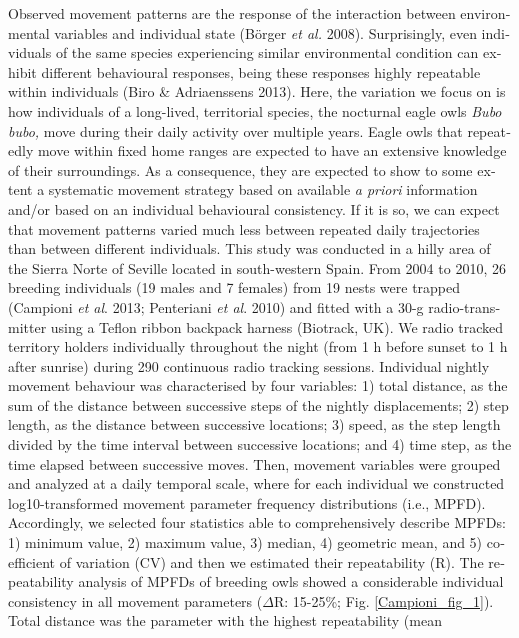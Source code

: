 \begin{otherlanguage}{english}
\vspace{1cm}
Observed movement patterns are the response of the interaction between
environmental variables and individual state (B\"orger \textit{et al.}
2008). Surprisingly, even individuals of the same species experiencing
similar environmental condition can exhibit different behavioural
responses, being these responses highly repeatable within individuals
(Biro \& Adriaenssens 2013). Here, the variation we focus on is how
individuals of a long-lived, territorial species, the nocturnal eagle
owls \textit{Bubo bubo,} move during their daily activity over multiple
years. Eagle owls that repeatedly move within fixed home ranges are
expected to have an extensive knowledge of their surroundings. As a
consequence, they are expected to show to some extent a systematic
movement strategy based on available \textit{a priori} information
and/or based on an individual behavioural consistency. If it is so, we
can expect that movement patterns varied much less between repeated
daily trajectories than between different individuals. This study was
conducted in a hilly area of the Sierra Norte of Seville located in
south-western Spain. From 2004 to 2010, 26 breeding individuals (19
males and 7 females) from 19 nests were trapped (Campioni \textit{et
al}. 2013; Penteriani \textit{et al}. 2010) and fitted with a 30-g
radio-transmitter using a Teflon ribbon backpack harness (Biotrack,
UK). We radio tracked territory holders individually throughout the
night (from 1 h before sunset to 1 h after sunrise) during 290
continuous radio tracking sessions. Individual nightly movement
behaviour was characterised by four variables: 1) total distance, as
the sum of the distance between successive steps of the nightly
displacements; 2) step length, as the distance between successive
locations; 3) speed, as the step length divided by the time interval
between successive locations; and 4) time step, as the time elapsed
between successive moves. Then, movement variables were grouped and
analyzed at a daily temporal scale, where for each individual we
constructed log10-transformed movement parameter frequency
distributions (i.e., MPFD). Accordingly, we selected four statistics
able to comprehensively describe MPFDs: 1) minimum value, 2) maximum
value, 3) median, 4) geometric mean, and 5) coefficient of variation
(CV) and then we estimated their repeatability (R). The repeatability
analysis of MPFDs of breeding owls showed a considerable individual
consistency in all movement parameters ($\Delta $R: 15-25\%; Fig. \ref{Campioni_fig_1}).
Total distance was the parameter with the highest repeatability (mean

\end{otherlanguage}
